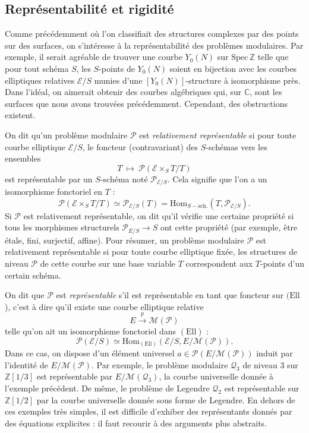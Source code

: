 \documentclass[11pt,a4paper]{article}
\newcommand{\Z}{\mathbb{Z}}
\newcommand{\C}{\mathbb{C}}
\newcommand{\E}{\mathcal{E}}
\renewcommand{\Pr}{\mathcal{P}}
\newcommand{\Qr}{\mathcal{Q}}
\newcommand{\M}{\mathcal{M}}
\newcommand{\vers}{\longrightarrow}
\newcommand{\Hom}{\mathrm{Hom}}
\newcommand{\Ell}{\mathrm{Ell}}
\newcommand{\Spec}{\mathrm{Spec}\,}
\renewcommand{\v}{\vspace{5mm}}
\theoremstyle{definition}
\begin{document}
\subsection{Représentabilité et rigidité}

Comme précédemment où l'on classifiait des structures complexes par des points sur des surfaces, on s'intéresse à la représentabilité des problèmes modulaires. Par exemple, il serait agréable de trouver une courbe $Y_0(N)$ sur $\Spec\Z$ telle que pour tout schéma $S$, les $S$-points de $Y_0(N)$ soient en bijection avec les courbes elliptiques relatives $\E/S$ munies d'une $[Y_0(N)]$-structure à isomorphisme près. Dans l'idéal, on aimerait obtenir des courbes algébriques qui, sur $\C$, sont les surfaces que nous avons trouvées précédemment. Cependant, des obstructions existent.
\v

On dit qu'un problème modulaire $\Pr$ est \emph{relativement représentable} si pour toute courbe elliptique $\E/S$, le foncteur (contravariant) des $S$-schémas vers les ensembles
$$T \ \longmapsto\ \Pr(\E\times_S T / T)$$
est représentable par un $S$-schéma noté $\Pr_{\E/S}$. Cela signifie que l'on a un isomorphisme fonctoriel en $T$ :
$$\Pr(\E\times_S T / T) \simeq \Pr_{\E/S}(T) = \Hom_{S-\text{sch.}}(T, \Pr_{\E/S}).$$
Si $\Pr$ est relativement représentable, on dit qu'il vérifie une certaine propriété si tous les morphismes structurels $\Pr_{E/S}\vers S$ ont cette propriété (par exemple, être étale, fini, surjectif, affine). Pour résumer, un problème modulaire $\Pr$ est relativement représentable si pour toute courbe elliptique fixée, les structures de niveau $\Pr$ de cette courbe sur une base variable $T$ correspondent aux $T$-points d'un certain schéma.

On dit que $\Pr$ est \emph{représentable} s'il est représentable en tant que foncteur sur $(\Ell$), c'est à dire qu'il existe une courbe elliptique relative
$$E \overset{p}\vers \M(\Pr)$$
telle qu'on ait un isomorphisme fonctoriel dans $(\Ell)$ :
$$\Pr(\E/S) \simeq \Hom_{(\Ell)}(\E/S, E/\M(\Pr)).$$
Dans ce cas, on dispose d'un élément universel $a\in \Pr(E/\M(\Pr))$ induit par l'identité de $E/\M(\Pr)$. Par exemple, le problème modulaire $\Qr_3$ de niveau 3 sur $\Z[1/3]$ est représentable par $E/\M(\Qr_3)$, la courbe 
universelle donnée à l'exemple précédent. De même, le problème de Legendre $\Qr_2$ est représentable sur $\Z[1/2]$ par la courbe universelle donnée sous forme de Legendre. En dehors de ces exemples très simples, il est difficile d'exhiber des représentants donnés par des équations explicites : il faut recourir à des arguments plus abstraits.
\v
\end{document}
